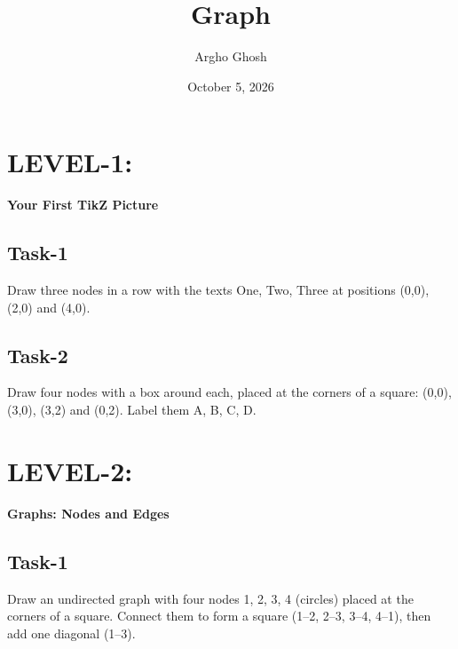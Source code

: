 \documentclass{article}
\title{Graph}
\author{Argho Ghosh}
\date{October 5, 2026}
\begin{document}
\maketitle

\tableofcontents
\newpage
\section{LEVEL-1:} \textbf{Your First TikZ Picture}
\subsection{Task-1}
Draw three nodes in a row with the texts One, Two, Three at positions (0,0), (2,0) and (4,0).\\


\begin{center}
\end{center}


\subsection{Task-2}
Draw four nodes with a box around each, placed at the corners of a square: (0,0), (3,0), (3,2)
and (0,2). Label them A, B, C, D.\\

\begin{center}
\end{center}
\newpage

\section{LEVEL-2:}
\textbf{Graphs: Nodes and Edges}
\subsection{Task-1}
Draw an undirected graph with four nodes 1, 2, 3, 4 (circles) placed at the corners of a square.
Connect them to form a square (1–2, 2–3, 3–4, 4–1), then add one diagonal (1–3).\\
\end{document}
